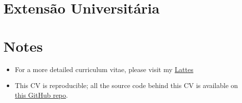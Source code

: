 \documentclass[11pt,a4paper,]{awesome-cv}
\providecommand{\tightlist}{%
	\setlength{\itemsep}{0pt}\setlength{\parskip}{0pt}}
\begin{document}
\hypertarget{extensuxe3o-universituxe1ria}{%
\section{\texorpdfstring{ Extensão
Universitária}{ Extensão Universitária}}\label{extensuxe3o-universituxe1ria}}

\begin{cventries}
    \vspace{-4.0mm}
    \vspace{-4.0mm}
\end{cventries}

\hypertarget{notes}{%
\section{Notes}\label{notes}}

\begin{itemize}
\tightlist
\item
  For a more detailed curriculum vitae, please visit my
  \href{http://lattes.cnpq.br/8074214277248039}{Lattes}
\item
  This CV is reproducible; all the source code behind this CV is
  available on \href{https://github.com/csthiago/cv}{this GitHub repo}.
\end{itemize}
\end{document}
